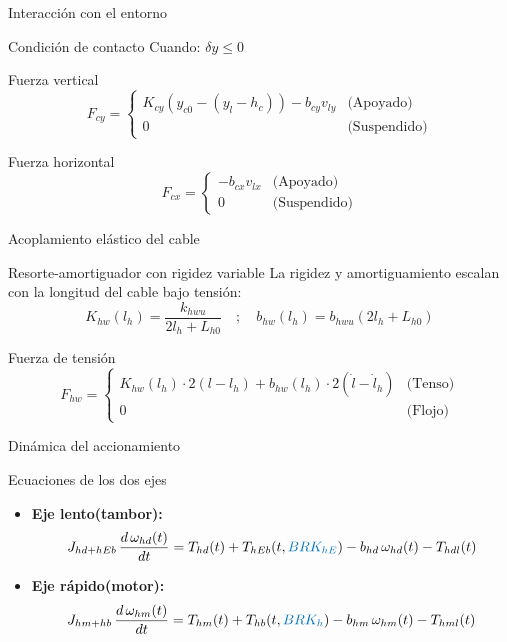 \begin{frame}{Interacción con el entorno}
  \begin{block}{Condición de contacto}
    Cuando: $\delta y \le 0$ 
  \end{block}

  \begin{block}{Fuerza vertical}
    \[
    F_{cy} = 
    \begin{cases} 
      K_{cy}(y_{c0} - (y_l - h_c)) - b_{cy} v_{ly} & \text{(Apoyado)} \\[4pt]
      0 & \text{(Suspendido)}
    \end{cases}
    \]
  \end{block}

  \begin{block}{Fuerza horizontal}
    \[
    F_{cx} = 
    \begin{cases} 
      -b_{cx} v_{lx} & \text{(Apoyado)} \\[4pt]
      0 & \text{(Suspendido)}
    \end{cases}
    \]
  \end{block}
\end{frame}

\begin{frame}{Acoplamiento elástico del cable}
  \begin{block}{Resorte-amortiguador con rigidez variable}
    La rigidez y amortiguamiento escalan con la longitud del cable bajo tensión:
    \[
    K_{hw}(l_h) = \frac{k_{hwu}}{2 l_h + L_{h0}} \quad ; \quad b_{hw}(l_h) = b_{hwu}(2 l_h + L_{h0})
    \]
  \end{block}

  \begin{block}{Fuerza de tensión}
    \[
    F_{hw} = 
    \begin{cases} 
      K_{hw}(l_h) \cdot 2(l - l_h) + b_{hw}(l_h) \cdot 2(\dot{l} - \dot{l}_h) & \text{(Tenso)} \\[4pt]
      0 & \text{(Flojo)}
    \end{cases}
    \]
  \end{block}
\end{frame}

\begin{frame}{Dinámica del accionamiento}
  \small
  \begin{block}{Ecuaciones de  los dos ejes}
    \begin{itemize}
      \item \textbf{Eje lento(tambor):}
      \begin{equation*}
        J_{hd+hEb} \, \frac{d \, \omega_{hd}(t)}{dt} = T_{hd}(t) + T_{hEb}(t,\textcolor{signalcolor}{BRK_{hE}}) - b_{hd} \, \omega_{hd}(t) - T_{hdl}(t)
      \end{equation*}
      \item \textbf{Eje rápido(motor):} 
      \begin{equation*}
        J_{hm+hb} \, \frac{d \, \omega_{hm}(t)}{dt} = T_{hm}(t) + T_{hb}(t,\textcolor{signalcolor}{BRK_{h}}) - b_{hm} \, \omega_{hm}(t) - T_{hml}(t)
      \end{equation*}
    \end{itemize}
  \end{block}
\end{frame}

